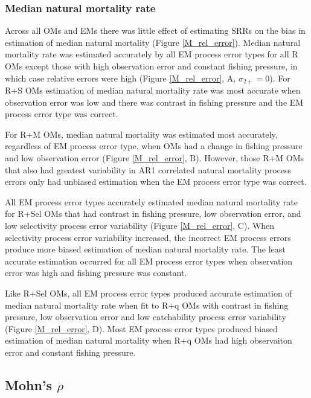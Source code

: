 \documentclass[
  12pt,
]{article}
\begin{document}
\hypertarget{median-natural-mortality-rate}{%
\subsubsection*{Median natural mortality
rate}\label{median-natural-mortality-rate}}

Across all OMs and EMs there was little effect of estimating SRRs on the
bias in estimation of median natural mortality (Figure
\ref{M_rel_error}). Median natural mortality rate was estimated
accurately by all EM process error types for all R OMs except those with
high observation error and constant fishing pressure, in which case
relative errors were high (Figure \ref{M_rel_error}, A,
\(\sigma_{2+} = 0\)). For R+S OMs estimation of median natural mortality
rate was most accurate when observation error was low and there was
contrast in fishing pressure and the EM process error type was correct.

For R+M OMs, median natural mortality was estimated most accurately,
regardless of EM process error type, when OMs had a change in fishing
pressure and low observation error (Figure \ref{M_rel_error}, B).
However, those R+M OMs that also had greatest variability in AR1
correlated natural mortality process errors only had unbiased estimation
when the EM process error type was correct.

All EM process error types accurately estimated median natural mortality
rate for R+Sel OMs that had contrast in fishing pressure, low
observation error, and low selectivity process error variability (Figure
\ref{M_rel_error}, C). When selectivity process error variability
increased, the incorrect EM process errors produce more biased
estimation of median natural mortality rate. The least accurate
estimation occurred for all EM process error types when observation
error was high and fishing pressure was constant.

Like R+Sel OMs, all EM process error types produced accurate estimation
of median natural mortality rate when fit to R+q OMs with contrast in
fishing pressure, low observation error and low catchability process
error variability (Figure \ref{M_rel_error}, D). Most EM process error
types produced biased estimation of median natural mortality when R+q
OMs had high observaiton error and constant fishing pressure.

\hypertarget{mohns-rho-1}{%
\subsection*{\texorpdfstring{Mohn's
\(\rho\)}{Mohn's \textbackslash rho}}\label{mohns-rho-1}}
\end{document}
